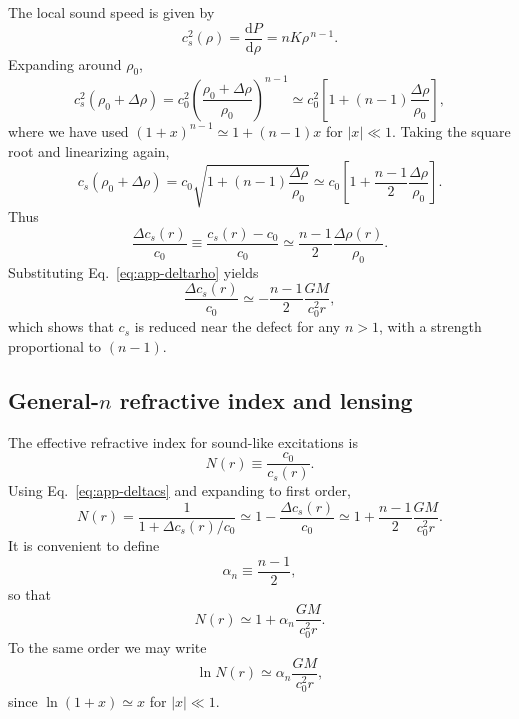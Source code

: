 \documentclass[11pt]{article}
\begin{document}
The local sound speed is given by
\begin{equation}
  c_s^2(\rho)
  = \frac{\mathrm{d}P}{\mathrm{d}\rho}
  = n K \rho^{\,n-1}.
\end{equation}
Expanding around $\rho_0$,
\begin{equation}
  c_s^2(\rho_0 + \Delta\rho)
  = c_0^2\left(\frac{\rho_0 + \Delta\rho}{\rho_0}\right)^{n-1}
  \simeq c_0^2\left[1 + (n-1)\frac{\Delta\rho}{\rho_0}\right],
\end{equation}
where we have used $(1+x)^{n-1} \simeq 1 + (n-1)x$ for $|x|\ll1$.
Taking the square root and linearizing again,
\begin{equation}
  c_s(\rho_0 + \Delta\rho)
  = c_0\sqrt{1 + (n-1)\frac{\Delta\rho}{\rho_0}}
  \simeq c_0\left[1 + \frac{n-1}{2}\frac{\Delta\rho}{\rho_0}\right].
\end{equation}
Thus
\begin{equation}
  \frac{\Delta c_s(r)}{c_0}
  \equiv \frac{c_s(r) - c_0}{c_0}
  \simeq \frac{n-1}{2}\frac{\Delta\rho(r)}{\rho_0}.
  \label{eq:app-deltacs-rho}
\end{equation}
Substituting Eq.~\eqref{eq:app-deltarho} yields
\begin{equation}
  \frac{\Delta c_s(r)}{c_0}
  \simeq -\frac{n-1}{2}\frac{GM}{c_0^2 r},
  \label{eq:app-deltacs}
\end{equation}
which shows that $c_s$ is reduced near the defect for any $n>1$, with a
strength proportional to $(n-1)$.


\subsection{General-\texorpdfstring{$n$}{n} refractive index and lensing}
\label{subsec:app-general-n-lensing}

The effective refractive index for sound-like excitations is
\begin{equation}
  N(r)
  \equiv \frac{c_0}{c_s(r)}.
\end{equation}
Using Eq.~\eqref{eq:app-deltacs} and expanding to first order,
\begin{equation}
  N(r)
  = \frac{1}{1 + \Delta c_s(r)/c_0}
  \simeq 1 - \frac{\Delta c_s(r)}{c_0}
  \simeq 1 + \frac{n-1}{2}\frac{GM}{c_0^2 r}.
\end{equation}
It is convenient to define
\begin{equation}
  \alpha_n \equiv \frac{n-1}{2},
\end{equation}
so that
\begin{equation}
  N(r)
  \simeq 1 + \alpha_n \frac{GM}{c_0^2 r}.
  \label{eq:app-N-general}
\end{equation}
To the same order we may write
\begin{equation}
  \ln N(r)
  \simeq \alpha_n \frac{GM}{c_0^2 r},
  \label{eq:app-lnN-general}
\end{equation}
since $\ln(1+x)\simeq x$ for $|x|\ll1$.
\end{document}
